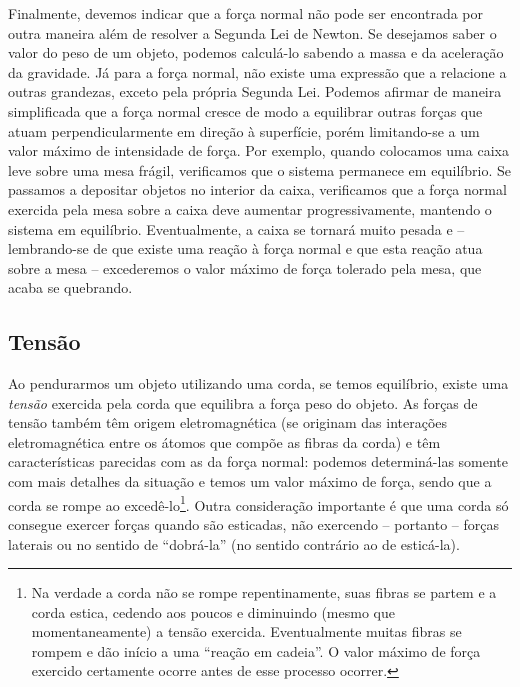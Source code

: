 Finalmente, devemos indicar que a força normal não pode ser encontrada por outra maneira além de resolver a Segunda Lei de Newton. Se desejamos saber o valor do peso de um objeto, podemos calculá-lo sabendo a massa e da aceleração da gravidade. Já para a força normal, não existe uma expressão que a relacione a outras grandezas, exceto pela própria Segunda Lei. Podemos afirmar de maneira simplificada que a força normal cresce de modo a equilibrar outras forças que atuam perpendicularmente em direção à superfície, porém limitando-se a um valor máximo de intensidade de força. Por exemplo, quando colocamos uma caixa leve sobre uma mesa frágil, verificamos que o sistema permanece em equilíbrio. Se passamos a depositar objetos no interior da caixa, verificamos que a força normal exercida pela mesa sobre a caixa deve aumentar progressivamente, mantendo o sistema em equilíbrio. Eventualmente, a caixa se tornará muito pesada e -- lembrando-se de que existe uma reação à força normal e que esta reação atua sobre a mesa -- excederemos o valor máximo de força tolerado pela mesa, que acaba se quebrando.

\subsection{Tensão} 
Ao pendurarmos um objeto utilizando uma corda, se temos equilíbrio, existe uma \emph{tensão} exercida pela corda que equilibra a força peso do objeto. As forças de tensão também têm origem eletromagnética (se originam das interações eletromagnética entre os átomos que compõe as fibras da corda) e têm características parecidas com as da força normal: podemos determiná-las somente com mais detalhes da situação e temos um valor máximo de força, sendo que a corda se rompe ao excedê-lo\footnote{Na verdade a corda não se rompe repentinamente, suas fibras se partem e a corda estica, cedendo aos poucos e diminuindo (mesmo que momentaneamente) a tensão exercida. Eventualmente muitas fibras se rompem e dão início a uma ``reação em cadeia''. O valor máximo de força exercido certamente ocorre antes de esse processo ocorrer.}. Outra consideração importante é que uma corda só consegue exercer forças quando são esticadas, não exercendo -- portanto -- forças laterais ou no sentido de ``dobrá-la'' (no sentido contrário ao de esticá-la). 


